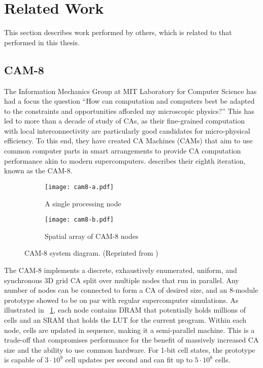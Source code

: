 
\section{Related Work}

This section describes work performed by others, which is related to that performed in this thesis.


\subsection{CAM-8}

The Information Mechanics Group at MIT Laboratory for Computer Science has had a focus the question ``How can computation and computers best be adapted to the constraints and opportunities afforded my microscopic physics?''
This has led to more than a decade of study of CAs, as their fine-grained computation with local interconnectivity are particularly good candidates for micro-physical efficiency.
To this end, they have created CA Machines (CAMs) that aim to use common computer parts in smart arrangements to provide CA computation performance akin to modern supercomputers.
\cite{margolus1996cam8} describes their eighth iteration, known as the CAM-8.

\begin{figure}[!ht]
    \centering
    \begin{subfigure}{0.48\textwidth}
        \centering
        \texttt{[image: cam8-a.pdf]}
        \caption{A single processing node}
    \end{subfigure}
    \begin{subfigure}{0.48\textwidth}
        \centering
        \texttt{[image: cam8-b.pdf]}
        \caption{Spatial array of CAM-8 nodes}
    \end{subfigure}
    \caption[CAM-8 system diagram]{
        CAM-8 system diagram.
        (Reprinted from \cite{margolus1996cam8})
    }
    \label{fig:cam-8}
\end{figure}

The CAM-8 implements a discrete, exhaustively enumerated, uniform, and synchronous 3D grid CA split over multiple nodes that run in parallel.
Any number of nodes can be connected to form a CA of desired size, and an 8-module prototype showed to be on par with regular supercomputer simulations.
As illustrated in \figurename~\ref{fig:cam-8}, each node contains DRAM that potentially holds millions of cells and an SRAM that holds the LUT for the current program.
Within each node, cells are updated in sequence, making it a semi-parallel machine.
This is a trade-off that compromises performance for the benefit of massively increased CA size and the ability to use common hardware.
For 1-bit cell states, the prototype is capable of $3 \cdot 10^9$ cell updates per second and can fit up to $5 \cdot 10^8$ cells.

